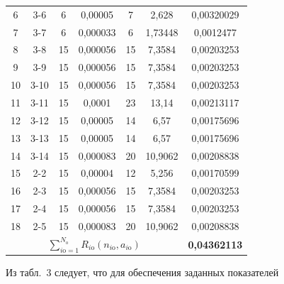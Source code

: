 \begin{table}
\begin{center}
\begin{tabular}{|c|c|c|c|c|c|c|}
\hphantom{9}6&3-6&\hphantom{9}6&0,00005\hphantom{9}&\hphantom{9}7&2,628&0,00320029\\

\hphantom{9}7&3-7&\hphantom{9}6&0,000033&\hphantom{9}6&1,73448&0,0012477\hphantom{9}\\

\hphantom{9}8&3-8&15&0,000056&15&7,3584&0,00203253\\

\hphantom{9}9&3-9&15&0,000056&15&7,3584&0,00203253\\

10&\hphantom{9}3-10&15&0,000056&15&7,3584&0,00203253\\

11&\hphantom{9}3-11&15&0,0001\hphantom{99}&23&13,14&0,00213117\\

12&\hphantom{9}3-12&15&0,00005\hphantom{9}&14&6,57&0,00175696\\

13&\hphantom{9}3-13&15&0,00005\hphantom{9}&14&6,57&0,00175696\\

14&\hphantom{9}3-14&15&0,000083&20&10,9062&0,00208838\\

15&2-2&15&0,00004\hphantom{9}&12&5,256&0,00170599\\

16&2-3&15&0,000056&15&7,3584&0,00203253\\

17&2-4&15&0,000056&15&7,3584&0,00203253\\

18&2-5&15&0,000083&20&10,9062&0,00208838\\

\hline

\multicolumn{6}{|c|}{$\sum\limits_{i\mathrm{o}=1}^{N_{\mathrm{o}}}R_{i\mathrm{o}}

(n_{i\mathrm{o}},

a_{i\mathrm{o}})$}&\textbf{0,04362113}\\

\hline

\end{tabular}

\end{center}

\end{table}



     Из табл.~3 следует, что для обеспечения заданных показателей

